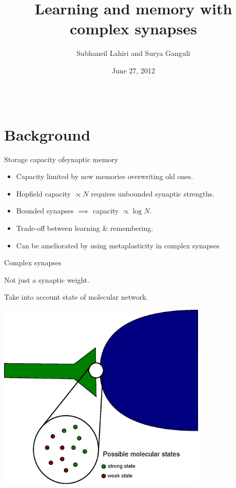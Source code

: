 \documentclass[final,hyperref={pdfpagelabels=false,bookmarks=false}]{beamer}
\title{Learning and memory with complex synapses}
\author{Subhaneil Lahiri and Surya Ganguli}
\institute[Stanford]{%
Department of Applied Physics, Stanford University, Stanford CA
}
\date[6/27/12]{June 27, 2012}%
\newcommand{\net}{molecular network}
\begin{document}
\begin{frame}{}

\begin{columns}[t]


\begin{column}{0.32\linewidth}

\section{Background}


\begin{block}{Storage capacity ofsynaptic memory}
%
 \begin{itemize}
   \item Capacity limited by new memories overwriting old ones.
   \item Hopfield capacity $\propto N$ requires unbounded synaptic strengths.
   \item Bounded synapses $\implies$ capacity $\propto\log N$.
   \item Trade-off between learning \& remembering.
   \item Can be ameliorated by using metaplasticity in complex synapses
 \end{itemize}
%
\end{block}


\begin{block}{Complex synapses}
%
\parbox{25cm}{
 Not just a synaptic weight.

 \vp Take into account state of \net.
}
\parbox{11cm}{
 \includegraphics[width=10cm]{synapse.eps}
}


\end{block}
\end{column}
\end{columns}
\end{frame}
\end{document}
